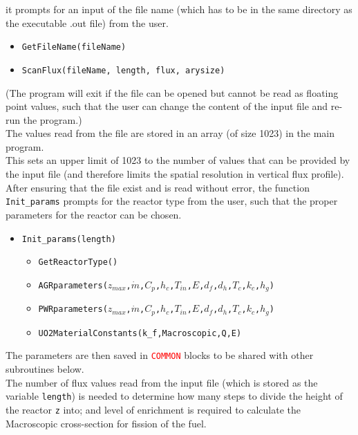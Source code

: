 \documentclass[a4paper, 12pt]{article}
\begin{document}
it prompts for an input of the file name (which has to be in the same directory as the executable .out file) from the user.
\begin{itemize}
	\item \texttt{\textcolor{subr}{GetFileName}(fileName)}
	\item \texttt{\textcolor{subr}{ScanFlux}(fileName, length, flux, arysize)}
\end{itemize}
(The program will exit if the file can be opened but cannot be read as floating point values, such that the user can change the content of the input file and re-run the program.)\\
The values read from the file are stored in an array (of size 1023) in the main program. \\
This sets an upper limit of 1023 to the number of values that can be provided by the input file (and therefore limits the spatial resolution in vertical flux profile).\\

After ensuring that the file exist and is read without error, the function \texttt{Init\_params} prompts for the reactor type from the user, such that the proper parameters for the reactor can be chosen.
\begin{itemize}
	\item \texttt{\textcolor{func}{Init\_params}(length)} 
	\begin{itemize}
		\item \texttt{\textcolor{func}{GetReactorType}()} 
		\item \texttt{\textcolor{subr}{AGRparameters}($z_{max}$,$\dot{m}$,$C_p$,$h_c$,$T_{in}$,$E$,$d_f$,$d_h$,$T_c$,$k_c$,$h_g$)}
		\item \texttt{\textcolor{subr}{PWRparameters}($z_{max}$,$\dot{m}$,$C_p$,$h_c$,$T_{in}$,$E$,$d_f$,$d_h$,$T_c$,$k_c$,$h_g$)}
		\item \texttt{\textcolor{subr}{UO2MaterialConstants}(k\_f,Macroscopic,Q,E)}
	\end{itemize}
\end{itemize}
The parameters are then saved in \texttt{\textcolor{red}{COMMON}} blocks to be shared with other subroutines below.\\
The number of flux values read from the input file (which is stored as the variable \texttt{length}) is needed to determine how many steps to divide the height of the reactor \texttt{z} into; and level of enrichment is required to calculate the Macroscopic cross-section for fission of the fuel.\\
\end{document}
